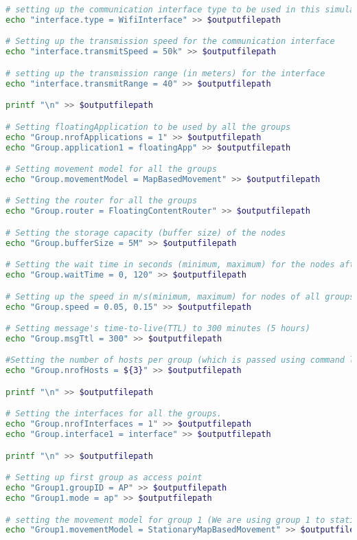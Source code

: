 \begin{lstlisting}[language=bash]
# setting up the communication interface type to be used in this simulation. Since this simulation is related to access points, we always use WifiInterface.
echo "interface.type = WifiInterface" >> $outputfilepath

# Setting up the transmission speed for the communication interface
echo "interface.transmitSpeed = 50k" >> $outputfilepath

# setting up the transmission range (in meters) for the interface
echo "interface.transmitRange = 40" >> $outputfilepath

printf "\n" >> $outputfilepath

# Setting floatingApplication to be used by all the groups
echo "Group.nrofApplications = 1" >> $outputfilepath
echo "Group.application1 = floatingApp" >> $outputfilepath

# Setting movement model for all the groups
echo "Group.movementModel = MapBasedMovement" >> $outputfilepath

# Setting the router for all the groups
echo "Group.router = FloatingContentRouter" >> $outputfilepath

# Setting the storage capacity (buffer size) of the nodes
echo "Group.bufferSize = 5M" >> $outputfilepath

# Setting the wait time in seconds (minimum, maximum) for the nodes after reaching destination
echo "Group.waitTime = 0, 120" >> $outputfilepath

# Setting up the speed in m/s(minimum, maximum) for nodes of all groups. We are defining the default speed to be walking speed
echo "Group.speed = 0.05, 0.15" >> $outputfilepath

# Setting message's time-to-live(TTL) to 300 minutes (5 hours)
echo "Group.msgTtl = 300" >> $outputfilepath

#Setting the number of hosts per group (which is passed using command line (${3})).
echo "Group.nrofHosts = ${3}" >> $outputfilepath

printf "\n" >> $outputfilepath

# Setting the interfaces for all the groups.
echo "Group.nrofInterfaces = 1" >> $outputfilepath
echo "Group.interface1 = interface" >> $outputfilepath

printf "\n" >> $outputfilepath

# Setting up first group as access point
echo "Group1.groupID = AP" >> $outputfilepath
echo "Group1.mode = ap" >> $outputfilepath

# setting the movement model for group 1 (We are using group 1 to stationary hosts)
echo "Group1.movementModel = StationaryMapBasedMovement" >> $outputfilepath


\end{lstlisting}
